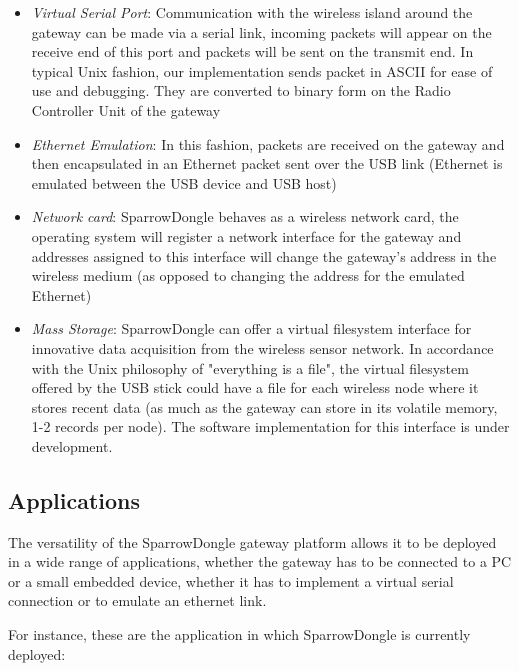 \begin{itemize}

\item \textit{Virtual Serial Port}: Communication with the wireless island
around the gateway can be made via a serial link, incoming packets will appear
on the receive end of this port and packets will be sent on the transmit end.
In typical Unix fashion, our implementation sends packet in ASCII for ease of
use and debugging. They are converted to binary form on the Radio Controller
Unit of the gateway

\item \textit{Ethernet Emulation}: In this fashion, packets are received on the
gateway and then encapsulated in an Ethernet packet sent over the USB link
(Ethernet is emulated between the USB device and USB host)

\item \textit{Network card}: SparrowDongle behaves as a wireless network card,
the operating system will register a network interface for the gateway and
addresses assigned to this interface will change the gateway's address in the
wireless medium (as opposed to changing the address for the emulated Ethernet)

\item \textit{Mass Storage}: SparrowDongle can offer a virtual filesystem
interface for innovative data acquisition from the wireless sensor network. In
accordance with the Unix philosophy of "everything is a file", the virtual
filesystem offered by the USB stick could have a file for each wireless node
where it stores recent data (as much as the gateway can store in its volatile
memory, 1-2 records per node). The software implementation for this interface
is under development.

 \end{itemize}

\subsection{Applications}


The versatility of the SparrowDongle gateway platform allows it to be deployed
in a wide range of applications, whether the gateway has to be connected to a
PC or a small embedded device, whether it has to implement a virtual serial
connection or to emulate an ethernet link.

For instance, these are the application in which SparrowDongle is currently
deployed:

